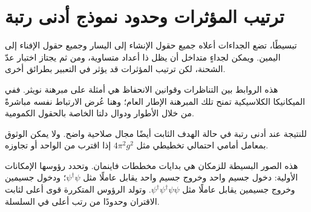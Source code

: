 \section{ترتيب المؤثرات وحدود نموذج أدنى رتبة}

تبسيطًا، تضع الجداءات أعلاه جميع حقول الإنشاء إلى اليسار وجميع حقول الإفناء إلى اليمين. ويمكن لجداءٍ متداخل أن يظل ذا أعداد متساوية، ومن ثم يجتاز اختبار عدّ الشحنة، لكن ترتيب المؤثرات قد يؤثر في التعبير بطرائق أخرى.

\begin{classroomqa}
\end{classroomqa}


هذه الروابط بين التناظرات وقوانين الانحفاظ هي أمثلة على مبرهنة نويثر. ففي الميكانيكا الكلاسيكية تمنح تلك المبرهنة الإطار العام؛ وهنا عُرض الارتباط نفسه مباشرةً من خلال الأطوار ودوال دلتا الخاصة بالحقول الكمومية.

للنتيجة عند أدنى رتبة في حالة الهدف الثابت أيضًا مجال صلاحية واضح. ولا يمكن الوثوق بمعامل أمامي احتمالي تخطيطي مثل \(4\pi^2g^2\) إذا اقترب من الواحد أو تجاوزه.

\begin{classroomqa}
\end{classroomqa}

هذه الصور البسيطة للزمكان هي بدايات مخططات فاينمان. وتحدد رؤوسها الإمكانات الأولية: دخول جسيم واحد وخروج جسيم واحد يقابل عاملًا مثل \(\psi^\dagger\psi\)؛ ودخول جسيمين وخروج جسيمين يقابل عاملًا مثل \(\psi^\dagger\psi^\dagger\psi\psi\). وتولد الرؤوس المتكررة قوى أعلى لثابت الاقتران وحدودًا من رتب أعلى في السلسلة.

